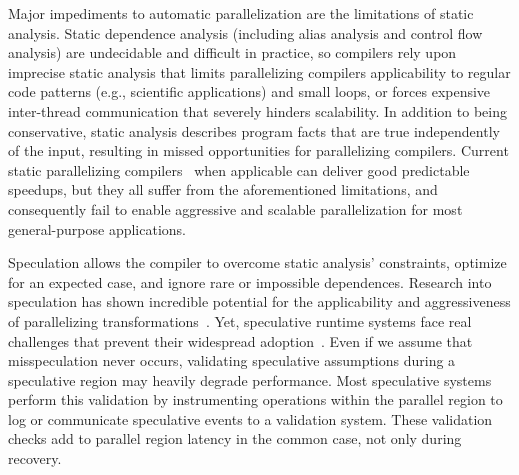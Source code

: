 Major impediments to automatic parallelization are the limitations of static
analysis. Static dependence analysis (including alias analysis and control flow
analysis) are undecidable and difficult in practice, so compilers rely upon
imprecise static analysis that limits parallelizing compilers applicability to
regular code patterns (e.g., scientific applications) and small loops, or forces
expensive inter-thread communication that severely hinders scalability.
%
In addition to being conservative, static analysis describes program facts that
are true independently of the input, resulting in missed opportunities for
parallelizing compilers.
Current static parallelizing compilers~\cite{HELIX, PS-DSWP, SUIF, non-SPEC
doall ...} when applicable can deliver good predictable speedups, but they all
suffer from the aforementioned limitations, and consequently fail to enable
aggressive and scalable parallelization for most general-purpose applications.

Speculation allows the compiler to overcome static analysis' constraints,
optimize for an expected
case, and ignore rare or impossible dependences.  Research into speculation has
shown incredible potential for the applicability and aggressiveness of
parallelizing transformations~\cite{Uncovering_malhke, privateer}.
%
Yet, speculative runtime systems face real challenges that prevent their
widespread adoption~\cite{cascaval:08:stmtoy:short, ..}. Even if we assume that
misspeculation never occurs, validating speculative assumptions during a
speculative region may heavily degrade performance.
%
Most speculative systems perform this validation by instrumenting operations
within the parallel region to log or communicate speculative events to a
validation system.  These validation checks add to parallel region latency in
the common case, not only during recovery.


